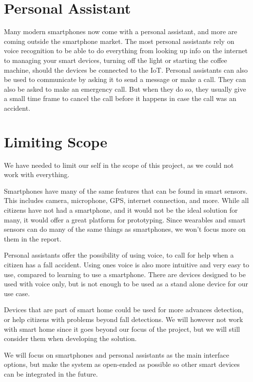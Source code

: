 \section*{Personal Assistant}
Many modern smartphones now come with a personal assistant, and more are coming outside the smartphone market. The most personal assistants rely on voice recognition to be able to do everything from looking up info on the internet to managing your smart devices, turning off the light or starting the coffee machine, should the devices be connected to the IoT. Personal assistants can also be used to communicate by asking it to send a message or make a call. They can also be asked to make an emergency call. But when they do so, they usually give a small time frame to cancel the call before it happens in case the call was an accident.

\section{Limiting Scope}
We have needed to limit our self in the scope of this project, as we could not work with everything.

Smartphones have many of the same features that can be found in smart sensors. This includes camera, microphone, GPS, internet connection, and more. While all citizens have not had a smartphone, and it would not be the ideal solution for many, it would offer a great platform for prototyping.
Since wearables and smart sensors can do many of the same things as smartphones, we won't focus more on them in the report.

Personal assistants offer the possibility of using voice, to call for help when a citizen has a fall accident. Using ones voice is also more intuitive and very easy to use, compared to learning to use a smartphone. There are devices designed to be used with voice only, but is not enough to be used as a stand alone device for our use case.

Devices that are part of smart home could be used for more advances detection, or help citizens with problems beyond fall detections. We will however not work with smart home since it goes beyond our focus of the project, but we will still consider them when developing the solution.

We will focus on smartphones and personal assistants as the main interface options, but make the system as open-ended as possible so other smart devices can be integrated in the future.
\fi